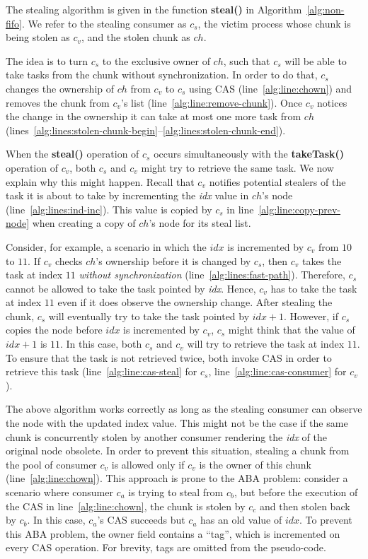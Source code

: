 The stealing algorithm is given in the function {\bf steal()} in Algorithm~\ref{alg:non-fifo}. 
We refer to the stealing consumer as $c_s$, the victim process whose chunk is being stolen as $c_v$, and the stolen chunk as $ch$.

The idea is to turn $c_s$ to the exclusive owner of $ch$, such that $c_s$ will be able to take tasks from the chunk without synchronization. 
In order to do that, $c_s$ changes the ownership of $ch$ from $c_v$ to $c_s$ using CAS (line~\ref{alg:line:chown}) and removes the chunk from $c_v$'s list (line~\ref{alg:line:remove-chunk}). 
Once $c_v$ notices the change in the ownership it can take at most one more task from $ch$ (lines~\ref{alg:lines:stolen-chunk-begin}--\ref{alg:lines:stolen-chunk-end}). 

When the {\bf steal()} operation of $c_s$ occurs simultaneously with the {\bf takeTask()} operation of $c_v$, both $c_s$ and $c_v$ might try to retrieve the same task. We now explain why this might happen. Recall that $c_v$ notifies potential stealers of the task it is about to take by incrementing the \emph{idx} value in $ch$'s node (line~\ref{alg:lines:ind-inc}). This value is copied by $c_s$ in line~\ref{alg:line:copy-prev-node} when creating a copy of $ch$'s node for its steal list.

Consider, for example, a scenario in which the $idx$ is incremented by $c_v$ from $10$ to $11$. 
If $c_v$ checks $ch$'s ownership before it is changed by $c_s$, then $c_v$ takes the task at index $11$ \emph{without synchronization} (line~\ref{alg:lines:fast-path}). Therefore, $c_s$ cannot be allowed to take the task pointed by \emph{idx}. Hence, $c_v$ has to take the task at index $11$ even if it does observe the ownership change. 
After stealing the chunk, $c_s$ will eventually try to take the task pointed by $idx+1$. However, if $c_s$ copies the node before $idx$ is incremented by $c_v$, $c_s$ might think that the value of $idx+1$ is $11$. In this case, both $c_s$ and $c_v$ will try to retrieve the task at index $11$. To ensure that the task is not retrieved twice, both invoke CAS in order to retrieve this task (line~\ref{alg:line:cas-steal} for $c_s$, line~\ref{alg:line:cas-consumer} for $c_v$). 

The above algorithm works correctly as long as the stealing consumer can observe the node with the updated index value. 
This might not be the case if the same chunk is concurrently stolen by another consumer rendering the \emph{idx} of the original node obsolete. 
In order to prevent this situation, stealing a chunk from the pool of consumer $c_v$ is allowed only if $c_v$ is the owner of this chunk (line~\ref{alg:line:chown}). This approach is prone to the ABA problem: consider a scenario where consumer $c_a$ is trying to steal from $c_b$, but before the execution of the CAS in line~\ref{alg:line:chown}, the chunk is stolen by $c_c$ and then stolen back by $c_b$. In this case, $c_a$'s CAS succeeds but $c_a$ has an old value of $idx$. To prevent this ABA problem, the owner field contains a ``tag'', which is incremented on every CAS operation. For brevity, tags are omitted from the pseudo-code.

